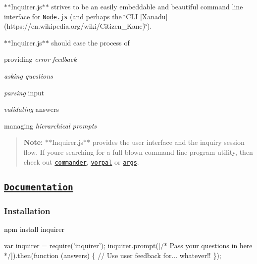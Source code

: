$\ast$$\ast${\ttfamily Inquirer.\+js}$\ast$$\ast$ strives to be an easily embeddable and beautiful command line interface for \href{https://nodejs.org/}{\tt Node.\+js} (and perhaps the \char`\"{}\+C\+L\+I \mbox{[}\+Xanadu\mbox{]}(https\+://en.\+wikipedia.\+org/wiki/\+Citizen\+\_\+\+Kane)\char`\"{}).

$\ast$$\ast${\ttfamily Inquirer.\+js}$\ast$$\ast$ should ease the process of
\begin{DoxyItemize}
\item providing {\itshape error feedback}
\item {\itshape asking questions}
\item {\itshape parsing} input
\item {\itshape validating} answers
\item managing {\itshape hierarchical prompts}
\end{DoxyItemize}

\begin{quote}
{\bfseries Note\+:} $\ast$$\ast${\ttfamily Inquirer.\+js}$\ast$$\ast$ provides the user interface and the inquiry session flow. If you\textquotesingle{}re searching for a full blown command line program utility, then check out \href{https://github.com/visionmedia/commander.js}{\tt commander}, \href{https://github.com/dthree/vorpal}{\tt vorpal} or \href{https://github.com/leo/args}{\tt args}. \end{quote}


\subsection*{\href{#documentation}{\tt Documentation}}

\label{_documentation}%


\subsubsection*{Installation}

\label{_installation}%



\begin{DoxyCode}
npm install inquirer
\end{DoxyCode}



\begin{DoxyCode}
var inquirer = require('inquirer');
inquirer.prompt([/* Pass your questions in here */]).then(function (answers) \{
    // Use user feedback for... whatever!!
\});
\end{DoxyCode}


